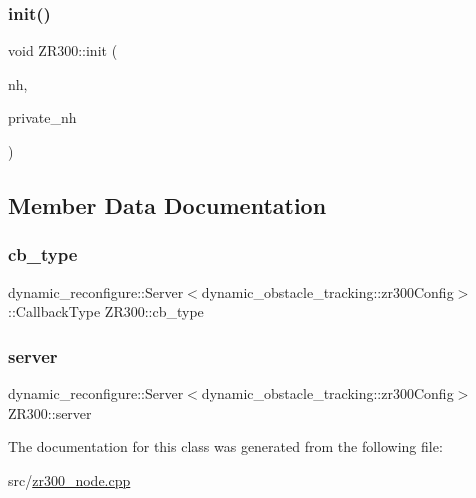 \mbox{\label{classZR300_aaecbf7e995d17a699c3305bc60dc547d}} 
\subsubsection{\texorpdfstring{init()}{init()}}
{\footnotesize\ttfamily void Z\+R300\+::init (\begin{DoxyParamCaption}\item[{ros\+::\+Node\+Handle \&}]{nh,  }\item[{ros\+::\+Node\+Handle \&}]{private\+\_\+nh }\end{DoxyParamCaption})}



\subsection{Member Data Documentation}
\mbox{\label{classZR300_ad68d353c780b751ba511b67f9b475b01}} 
\subsubsection{\texorpdfstring{cb\+\_\+type}{cb\_type}}
{\footnotesize\ttfamily dynamic\+\_\+reconfigure\+::\+Server$<$dynamic\+\_\+obstacle\+\_\+tracking\+::zr300\+Config$>$\+::Callback\+Type Z\+R300\+::cb\+\_\+type\hspace{0.3cm}{\ttfamily [protected]}}

\mbox{\label{classZR300_afe2acfe42f2153ef3a488367ffdfcca0}} 
\subsubsection{\texorpdfstring{server}{server}}
{\footnotesize\ttfamily dynamic\+\_\+reconfigure\+::\+Server$<$dynamic\+\_\+obstacle\+\_\+tracking\+::zr300\+Config$>$ Z\+R300\+::server\hspace{0.3cm}{\ttfamily [protected]}}



The documentation for this class was generated from the following file\+:\begin{DoxyCompactItemize}
\item 
src/\hyperlink{zr300__node_8cpp}{zr300\+\_\+node.\+cpp}\end{DoxyCompactItemize}
